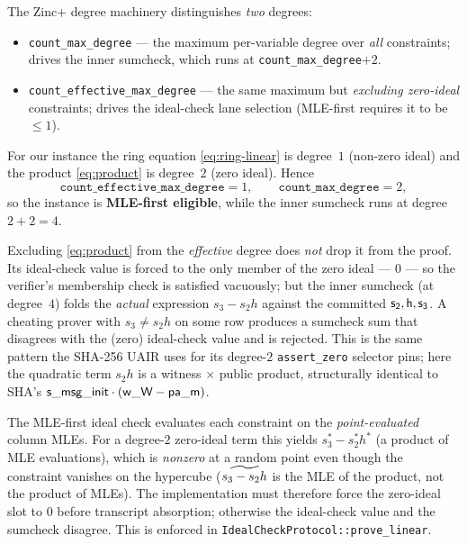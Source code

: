 The Zinc+ degree machinery distinguishes \emph{two} degrees:
\begin{itemize}[leftmargin=1.5em]
  \item \texttt{count\_max\_degree} --- the maximum per-variable degree
  over \emph{all} constraints; drives the inner sumcheck, which runs at
  \texttt{count\_max\_degree}$+2$.
  \item \texttt{count\_effective\_max\_degree} --- the same maximum but
  \emph{excluding zero-ideal} constraints; drives the ideal-check lane
  selection (MLE-first requires it to be $\le 1$).
\end{itemize}
For our instance the ring equation \eqref{eq:ring-linear} is degree~$1$
(non-zero ideal) and the product \eqref{eq:product} is degree~$2$ (zero
ideal). Hence
\[
  \texttt{count\_effective\_max\_degree} = 1, \qquad
  \texttt{count\_max\_degree} = 2,
\]
so the instance is \textbf{MLE-first eligible}, while the inner sumcheck
runs at degree $2+2 = 4$.

\begin{remark}\label{rem:soundness}
Excluding \eqref{eq:product} from the \emph{effective} degree does
\emph{not} drop it from the proof. Its ideal-check value is forced to the
only member of the zero ideal --- $0$ --- so the verifier's membership
check is satisfied vacuously; but the inner sumcheck (at degree~$4$)
folds the \emph{actual} expression $s_3 - s_2 h$ against the committed
$\mathsf{s_2},\mathsf{h},\mathsf{s_3}$. A cheating prover with $s_3 \ne s_2 h$ on
some row produces a sumcheck sum that disagrees with the (zero) ideal-check
value and is rejected. This is the same pattern the SHA-256 UAIR uses for
its degree-$2$ \texttt{assert\_zero} selector pins; here the quadratic term
$s_2 h$ is a witness $\times$ public product, structurally identical to
SHA's $\mathsf{s\_msg\_init}\cdot(\mathsf{w\_W}-\mathsf{pa\_m})$.
\end{remark}

\begin{remark}\label{rem:mlefirst-zero}
The MLE-first ideal check evaluates each constraint on the
\emph{point-evaluated} column MLEs. For a degree-$2$ zero-ideal term this
yields $s_3^\ast - s_2^\ast h^\ast$ (a product of MLE evaluations), which
is \emph{nonzero} at a random point even though the constraint vanishes on
the hypercube ($\widetilde{s_3 - s_2 h}$ is the MLE of the product, not the
product of MLEs). The implementation must therefore force the zero-ideal
slot to $0$ before transcript absorption; otherwise the ideal-check value
and the sumcheck disagree. This is enforced in
\texttt{IdealCheckProtocol::prove\_linear}.
\end{remark}
